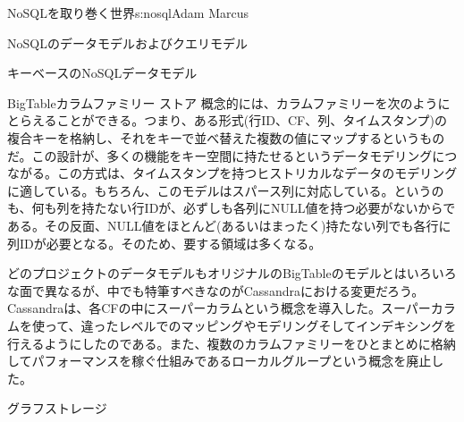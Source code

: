 \begin{aosachapter}{NoSQLを取り巻く世界}{s:nosql}{Adam Marcus}
\begin{aosasect1}{NoSQLのデータモデルおよびクエリモデル}
\begin{aosasect2}{キーベースのNoSQLデータモデル}
\begin{aosasect3}{BigTableカラムファミリー ストア}
概念的には、カラムファミリーを次のようにとらえることができる。つまり、ある形式(行ID、CF、列、タイムスタンプ)の複合キーを格納し、それをキーで並べ替えた複数の値にマップするというものだ。この設計が、多くの機能をキー空間に持たせるというデータモデリングにつながる。この方式は、タイムスタンプを持つヒストリカルなデータのモデリングに適している。もちろん、このモデルはスパース列に対応している。というのも、何も列を持たない行IDが、必ずしも各列にNULL値を持つ必要がないからである。その反面、NULL値をほとんど(あるいはまったく)持たない列でも各行に列IDが必要となる。そのため、要する領域は多くなる。

どのプロジェクトのデータモデルもオリジナルのBigTableのモデルとはいろいろな面で異なるが、中でも特筆すべきなのがCassandraにおける変更だろう。Cassandraは、各CFの中にスーパーカラムという概念を導入した。スーパーカラムを使って、違ったレベルでのマッピングやモデリングそしてインデキシングを行えるようにしたのである。また、複数のカラムファミリーをひとまとめに格納してパフォーマンスを稼ぐ仕組みであるローカルグループという概念を廃止した。

\end{aosasect3}

\end{aosasect2}

\begin{aosasect2}{グラフストレージ}


\end{aosasect2}
\end{aosasect1}
\end{aosachapter}
